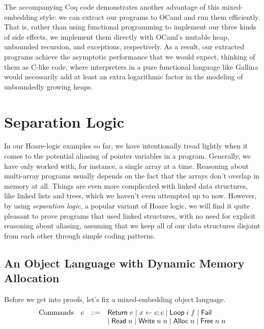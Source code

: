 \documentclass{amsbook}
\theoremstyle{definition}
\theoremstyle{remark}
\numberwithin{section}{chapter}
\numberwithin{equation}{chapter}
\begin{document}
The accompanying Coq code demonstrates another advantage of this mixed-embedding style: we can extract our programs to OCaml and run them efficiently.
That is, rather than using functional programming to implement our three kinds of side effects, we implement them directly with OCaml's mutable heap, unbounded recursion, and exceptions, respectively.
As a result, our extracted programs achieve the asymptotic performance that we would expect, thinking of them as C-like code, where interpreters in a pure functional language like Gallina would necessarily add at least an extra logarithmic factor in the modeling of unboundedly growing heaps.



\chapter{Separation Logic}\label{seplog}

In our Hoare-logic examples so far, we have intentionally tread lightly when it comes to the potential aliasing of pointer variables in a program.
Generally, we have only worked with, for instance, a single array at a time.
Reasoning about multi-array programs usually depends on the fact that the arrays don't overlap in memory at all.
Things are even more complicated with linked data structures, like linked lists and trees, which we haven't even attempted up to now.
However, by using \emph{separation logic}, a popular variant of Hoare logic, we will find it quite pleasant to prove programs that used linked structures, with no need for explicit reasoning about aliasing, assuming that we keep all of our data structures disjoint from each other through simple coding patterns.


\section{An Object Language with Dynamic Memory Allocation}

Before we get into proofs, let's fix a mixed-embedding object language.
$$\begin{array}{rrcl}
  \textrm{Commands} & c &::=& \mathsf{Return} \; v \mid x \leftarrow c; c \mid \mathsf{Loop} \; i \; f \mid \mathsf{Fail} \\
  &&& \mid \mathsf{Read} \; n \mid \mathsf{Write} \; n \; n \mid \mathsf{Alloc} \; n \mid \mathsf{Free} \; n \; n
\end{array}$$
\end{document}
